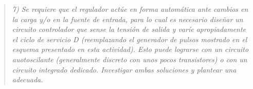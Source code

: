 \begin{quote} \textit{7) Se requiere que el regulador actúe en forma automática ante cambios en la carga y/o en la fuente de entrada, para lo cual es necesario diseñar un circuito controlador que sense la tensión de salida y varíe apropiadamente el ciclo de servicio D (reemplazando el generador de pulsos mostrado en el esquema presentado en esta actividad). Esto puede lograrse con un circuito auotoscilante (generalmente discreto con unos pocos transistores) o con un circuito integrado dedicado. Investigar ambas soluciones y plantear una adecuada.}
\end{quote}

